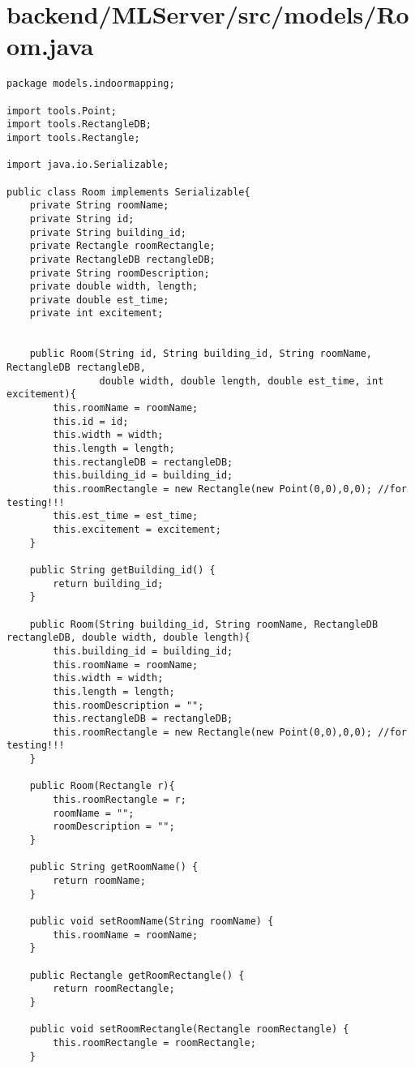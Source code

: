 \section{backend/MLServer/src/models/Room.java}
\begin{lstlisting}package models.indoormapping;

import tools.Point;
import tools.RectangleDB;
import tools.Rectangle;

import java.io.Serializable;

public class Room implements Serializable{
    private String roomName;
    private String id;
    private String building_id;
    private Rectangle roomRectangle;
    private RectangleDB rectangleDB;
    private String roomDescription;
    private double width, length;
    private double est_time;
    private int excitement;


    public Room(String id, String building_id, String roomName, RectangleDB rectangleDB,
                double width, double length, double est_time, int excitement){
        this.roomName = roomName;
        this.id = id;
        this.width = width;
        this.length = length;
        this.rectangleDB = rectangleDB;
        this.building_id = building_id;
        this.roomRectangle = new Rectangle(new Point(0,0),0,0); //for testing!!!
        this.est_time = est_time;
        this.excitement = excitement;
    }

    public String getBuilding_id() {
        return building_id;
    }

    public Room(String building_id, String roomName, RectangleDB rectangleDB, double width, double length){
        this.building_id = building_id;
        this.roomName = roomName;
        this.width = width;
        this.length = length;
        this.roomDescription = "";
        this.rectangleDB = rectangleDB;
        this.roomRectangle = new Rectangle(new Point(0,0),0,0); //for testing!!!
    }

    public Room(Rectangle r){
        this.roomRectangle = r;
        roomName = "";
        roomDescription = "";
    }

    public String getRoomName() {
        return roomName;
    }

    public void setRoomName(String roomName) {
        this.roomName = roomName;
    }

    public Rectangle getRoomRectangle() {
        return roomRectangle;
    }

    public void setRoomRectangle(Rectangle roomRectangle) {
        this.roomRectangle = roomRectangle;
    }


\end{lstlisting}
